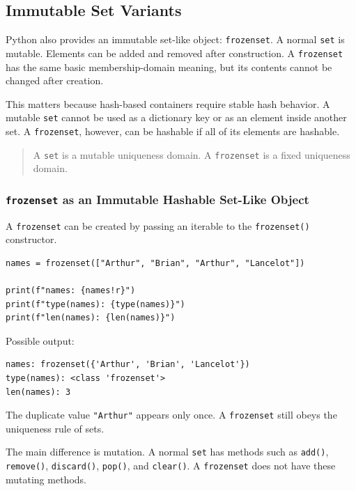 \subsection{Immutable Set Variants}

Python also provides an immutable set-like object: \texttt{frozenset}. A normal \texttt{set} is mutable. Elements can be added and removed after construction. A \texttt{frozenset} has the same basic membership-domain meaning, but its contents cannot be changed after creation.

This matters because hash-based containers require stable hash behavior. A mutable \texttt{set} cannot be used as a dictionary key or as an element inside another set. A \texttt{frozenset}, however, can be hashable if all of its elements are hashable.

\begin{quote}
A \texttt{set} is a mutable uniqueness domain. A \texttt{frozenset} is a fixed uniqueness domain.
\end{quote}

\subsubsection{\texttt{frozenset} as an Immutable Hashable Set-Like Object}

A \texttt{frozenset} can be created by passing an iterable to the \texttt{frozenset()} constructor.

\begin{verbatim}
names = frozenset(["Arthur", "Brian", "Arthur", "Lancelot"])

print(f"names: {names!r}")
print(f"type(names): {type(names)}")
print(f"len(names): {len(names)}")
\end{verbatim}

Possible output:

\begin{verbatim}
names: frozenset({'Arthur', 'Brian', 'Lancelot'})
type(names): <class 'frozenset'>
len(names): 3
\end{verbatim}

The duplicate value \texttt{"Arthur"} appears only once. A \texttt{frozenset} still obeys the uniqueness rule of sets.

The main difference is mutation. A normal \texttt{set} has methods such as \texttt{add()}, \texttt{remove()}, \texttt{discard()}, \texttt{pop()}, and \texttt{clear()}. A \texttt{frozenset} does not have these mutating methods.

